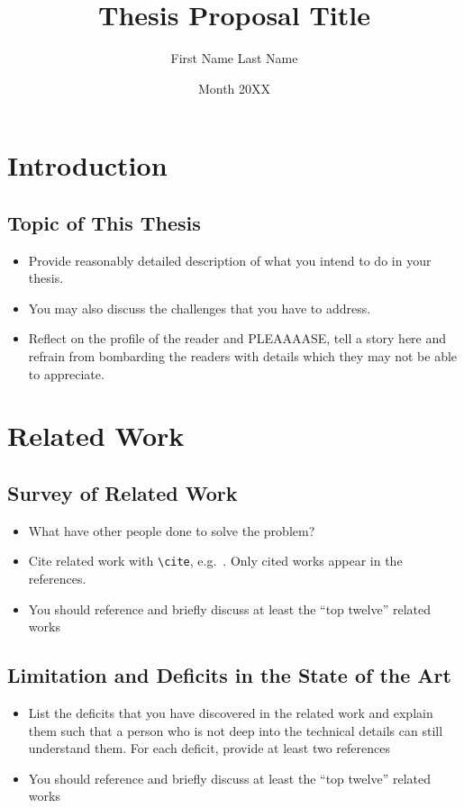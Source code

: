 \documentclass[master]{thesis_proposal}
\title{Thesis Proposal Title}
\author{First Name Last Name}
\date{Month 20XX}
\begin{document}
\maketitle

\pagestyle{plain}

\section{Introduction}

\subsection{Topic of This Thesis}
\begin{itemize}
    \item Provide reasonably detailed description of what you intend to do in your thesis.
    \item You may also discuss the challenges that you have to address.
    \item Reflect on the profile of the reader and PLEAAAASE, tell a story here and refrain from bombarding the readers with details which they may not be able to appreciate.
\end{itemize}

\section{Related Work}

\subsection{Survey of Related Work}
\begin{itemize}
    \item What have other people done to solve the problem?
    \item Cite related work with \verb|\cite|, e.g.~\cite{art1}. Only cited works appear in the references.
    \item You should reference and briefly discuss at least the ``top twelve'' related works
\end{itemize}

\subsection{Limitation and Deficits in the State of the Art}
\begin{itemize}
    \item List the deficits that you have discovered in the related work and explain them such that a person who is not deep into the technical details can still understand them.
    For each deficit, provide at least two references
    \item You should reference and briefly discuss at least the ``top twelve'' related works
\end{itemize}
\end{document}
